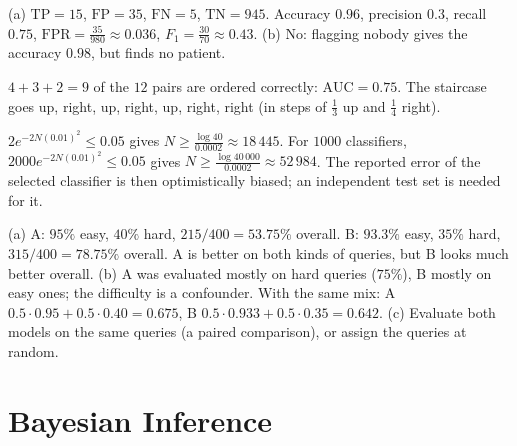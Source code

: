 \documentclass[11pt]{article}
\begin{document}
\begin{description}[leftmargin=0pt, itemsep=0.3em]
    \item[\ref{pr:metrics-practice}.] (a) $\mathrm{TP} = 15$, $\mathrm{FP} = 35$, $\mathrm{FN} = 5$, $\mathrm{TN} = 945$. Accuracy $0.96$, precision $0.3$, recall $0.75$, $\mathrm{FPR} = \frac{35}{980} \approx 0.036$, $F_1 = \frac{30}{70} \approx 0.43$. (b) No: flagging nobody gives the accuracy $0.98$, but finds no patient.
    \item[\ref{pr:auc-practice}.] $4 + 3 + 2 = 9$ of the $12$ pairs are ordered correctly: $\mathrm{AUC} = 0.75$. The staircase goes up, right, up, right, up, right, right (in steps of $\frac{1}{3}$ up and $\frac{1}{4}$ right).
    \item[\ref{pr:generalization-practice}.] $2e^{-2N(0.01)^2} \leq 0.05$ gives $N \geq \frac{\log 40}{0.0002} \approx 18\,445$. For $1000$ classifiers, $2000e^{-2N(0.01)^2} \leq 0.05$ gives $N \geq \frac{\log 40\,000}{0.0002} \approx 52\,984$. The reported error of the selected classifier is then optimistically biased; an independent test set is needed for it.
    \item[\ref{pr:simpson}.] (a) A: $95\%$ easy, $40\%$ hard, $215/400 = 53.75\%$ overall. B: $93.3\%$ easy, $35\%$ hard, $315/400 = 78.75\%$ overall. A is better on both kinds of queries, but B looks much better overall. (b) A was evaluated mostly on hard queries ($75\%$), B mostly on easy ones; the difficulty is a confounder. With the same mix: A $0.5 \cdot 0.95 + 0.5 \cdot 0.40 = 0.675$, B $0.5 \cdot 0.933 + 0.5 \cdot 0.35 = 0.642$. (c) Evaluate both models on the same queries (a paired comparison), or assign the queries at random.
\end{description}

\section*{Bayesian Inference}
\end{document}
